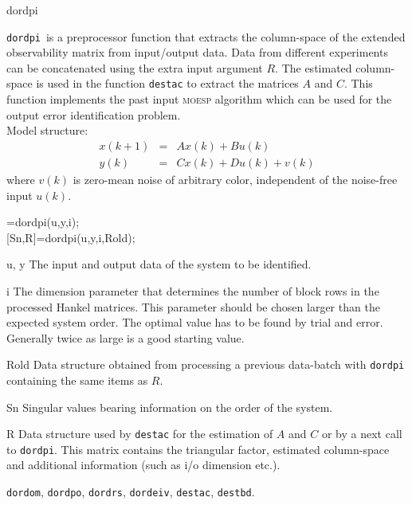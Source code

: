 \documentclass{book}
\newcommand{\moesp}{\textsc{moesp}}
\newcommand{\destbd}{\texttt{destbd}}
\newcommand{\dordom}{\texttt{dordom}}
\newcommand{\dordpo}{\texttt{dordpo}}
\newcommand{\dordpi}{\texttt{dordpi}}
\newcommand{\dordrs}{\texttt{dordrs}}
\newcommand{\dordeiv}{\texttt{dordeiv}}
\newcommand{\destac}{\texttt{destac}}
\begin{document}
\begin{command}{dordpi}
\begin{purpose}
  \dordpi\ is a preprocessor function that extracts the column-space of
  the extended observability matrix from input/output data. Data from
  different experiments can be concatenated using the extra input
  argument $R$. The estimated column-space is used in the function {\destac} 
  to extract the matrices $A$ and $C$.  This function implements the
  past input {\moesp} algorithm which can be used for the output error
  identification problem.\\
  Model structure: 
  \begin{eqnarray*}
    x(k+1) &=& Ax(k) + Bu(k)\\
    y(k)   &=& Cx(k) + Du(k) + v(k)
  \end{eqnarray*}
  where $v(k)$ is zero-mean noise of arbitrary color, 
  independent of the noise-free input $u(k)$.
\end{purpose}

\begin{syntax}
[Sn,R]=dordpi(u,y,i);\\[0pt]
[Sn,R]=dordpi(u,y,i,Rold);
\end{syntax}

\begin{inputs}
\item[u, y] The input and output data of the system to be
  identified.
\item[i] The dimension parameter that determines the number of block
  rows in the processed Hankel matrices. This parameter should be
  chosen larger than the expected system order. The optimal value has
  to be found by trial and error. Generally twice as large is a good
  starting value.
\item[Rold] Data structure obtained from processing a previous
  data-batch with {\dordpi} containing the same items as $R$.
\end{inputs}

\begin{outputs}
\item[Sn] Singular values bearing information on the order of the
  system.
\item[R] Data structure used by {\destac} for the estimation of $A$
  and $C$ or by a next call to {\dordpi}. This matrix contains the
  triangular factor, estimated column-space and additional information
  (such as i/o dimension etc.).
\end{outputs}

\begin{seealso}
\dordom, \dordpo, \dordrs, \dordeiv, \destac, \destbd.
\end{seealso}
\end{command}%
\end{document}
